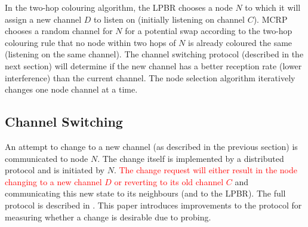 In the two-hop colouring algorithm, the LPBR chooses a node $N$ to which it will assign a new channel $D$ to listen on (initially listening on channel $C$).  MCRP chooses a random channel for $N$ for a potential swap according to the two-hop colouring rule that no node within two hops of $N$ is already coloured the same (listening on the same channel).  The channel switching protocol (described in the next section) will determine if the new channel has a better reception rate (lower interference) than the current channel.  The node selection algorithm iteratively changes one node channel at a time. 


\subsection{Channel Switching}
\label{sec:switching}

An attempt to change to a new channel (as described in the previous section) is communicated to node $N$.  The change itself is implemented by a distributed protocol and is initiated  by $N$. \textcolor{red}{The change request will either result in the node changing to a new channel $D$ or reverting to its old channel $C$} and communicating this new state to its neighbours (and to the LPBR).  The full protocol is described in \cite{mcrp}.  This paper introduces improvements to the protocol for measuring whether a change is desirable due to probing.



